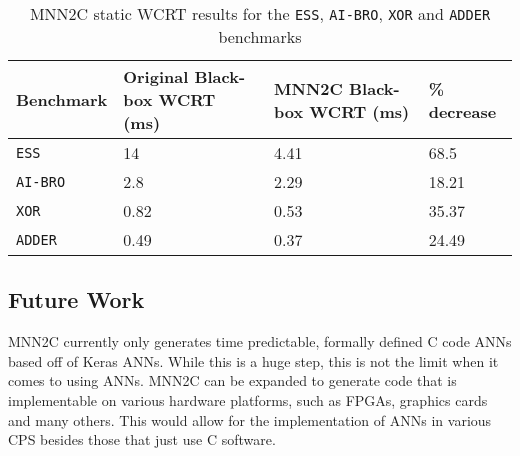 \begin{table}[H]
	\centering
	\caption{MNN2C static \ac{WCRT} results for the \texttt{ESS}, \texttt{AI-BRO}, \texttt{XOR} and \texttt{ADDER} benchmarks}
	\label{tbl:res-mnn2c}
	\begin{tabular}{|p{}|p{}|p{}|p{}|}
		\hline
		Benchmark         & Original Black-box WCRT (ms) & MNN2C Black-box WCRT (ms)  &  \% \textbf{decrease} \\ \hline
		\texttt{ESS}        & 14 & 4.41 & 68.5 \\  \hline
		\texttt{AI-BRO}        & 2.8 & 2.29 & 18.21 \\ \hline
		\texttt{XOR}        & 0.82 & 0.53 & 35.37 \\  \hline
		\texttt{ADDER}        & 0.49 & 0.37 & 24.49 \\ \hline
	\end{tabular}
\end{table}

\subsection{Future Work}
\ac{MNN2C} currently only generates time predictable, formally defined C code \acp{ANN} based off of Keras \acp{ANN}.
While this is a huge step, this is not the limit when it comes to using \acp{ANN}.
\ac{MNN2C} can be expanded to generate code that is implementable on various hardware platforms, such as \acp{FPGA}, graphics cards and many others.
This would allow for the implementation of \acp{ANN} in various \ac{CPS} besides those that just use C software.







